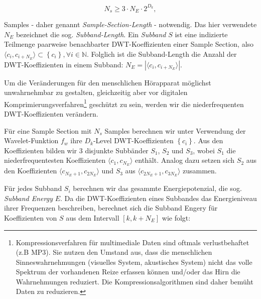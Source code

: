 	 \begin{equation}
		 {N}_{s} \geq 3 \cdot {N}_{E} \cdot 2 ^ {{D}_{k}}, 			\label{equ:samplseclength}
	 \end{equation}
	 
Samples - daher genannt \textit{Sample-Section-Length} - notwendig. Das hier verwendete ${N}_{E}$ bezeichnet die sog. \textit{Subband-Length}. Ein \textit{Subband} $S$ ist eine indizierte Teilmenge paarweise benachbarter DWT-Koeffizienten einer Sample Section, also $\langle{c}_{i},{c}_{i+{N}_{E}}\rangle \subset \left\{{c}_{i}\right\}, \forall i \in \mathbb{N}$. Folglich ist die Subband-Length die Anzahl der DWT-Koeffizienten in einem Subband: ${N}_{E} = |\langle{c}_{i},{c}_{i+{N}_{E}}\rangle|$.

\bigskip

Um die Veränderungen für den menschlichen Hörapparat möglichst unwahrnehmbar zu gestalten, gleichzeitig aber vor digitalen Komprimierungsverfahren\footnote{Kompressionsverfahren für multimediale Daten sind oftmals verlustbehaftet (z.B MP3). Sie nutzen den Umstand aus, dass die menschlichen Sinneswahrnehmungen (visuelles System, akustisches System) nicht das volle Spektrum der vorhandenen Reize erfassen können und/oder das Hirn die Wahrnehmungen reduziert. Die Kompressionsalgorithmen sind daher bemüht \grqq{} Daten zu reduzieren.} geschützt zu sein, werden wir die niederfrequenten DWT-Koeffizienten verändern. 

Für eine Sample Section mit ${N}_{s}$ Samples berechnen wir unter Verwendung der Wavelet-Funktion ${f}_{w}$ ihre ${D}_{k}$-Level DWT-Koeffizienten $\left\{{c}_{i}\right\}$. Aus den Koeffizienten bilden wir 3 disjunkte Subbänder ${S}_{1}$, ${S}_{2}$ und ${S}_{3}$, wobei ${S}_{1}$ die niederfrequentesten Koeffizienten $\langle{c}_{1},{c}_{{N}_{E}}\rangle$ enthält. Analog dazu setzen sich ${S}_{2}$ aus den Koeffizienten $\langle{c}_{{N}_{E}+1},{c}_{2{N}_{E}}\rangle$ und ${S}_{3}$ aus $\langle{c}_{2{N}_{E}+1},{c}_{3{N}_{E}}\rangle$ zusammen. 

Für jedes Subband ${S}_{i}$ berechnen wir das gesammte Energiepotenzial, die sog. \textit{Subband Energy} $E$. Da die DWT-Koeffizienten eines Subbandes das Energieniveau ihrer Frequenzen beschreiben, berechnet sich die Subband Engery für Koeffizienten von $S$ aus dem Intervall $[k, k+{N}_{E}]$ wie folgt:

